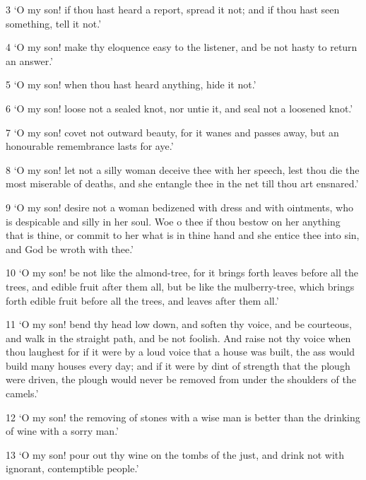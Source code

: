 \par 3 ‘O my son! if thou hast heard a report, spread it not; and if thou hast seen something, tell it not.’

\par 4 ‘O my son! make thy eloquence easy to the listener, and be not hasty to return an answer.’

\par 5 ‘O my son! when thou hast heard anything, hide it not.’

\par 6 ‘O my son! loose not a sealed knot, nor untie it, and seal not a loosened knot.’

\par 7 ‘O my son! covet not outward beauty, for it wanes and passes away, but an honourable remembrance lasts for aye.’

\par 8 ‘O my son! let not a silly woman deceive thee with her speech, lest thou die the most miserable of deaths, and she entangle thee in the net till thou art ensnared.’

\par 9 ‘O my son! desire not a woman bedizened with dress and with ointments, who is despicable and silly in her soul. Woe o thee if thou bestow on her anything that is thine, or commit to her what is in thine hand and she entice thee into sin, and God be wroth with thee.’

\par 10 ‘O my son! be not like the almond-tree, for it brings forth leaves before all the trees, and edible fruit after them all, but be like the mulberry-tree, which brings forth edible fruit before all the trees, and leaves after them all.’

\par 11 ‘O my son! bend thy head low down, and soften thy voice, and be courteous, and walk in the straight path, and be not foolish. And raise not thy voice when thou laughest for if it were by a loud voice that a house was built, the ass would build many houses every day; and if it were by dint of strength that the plough were driven, the plough would never be removed from under the shoulders of the camels.’

\par 12 ‘O my son! the removing of stones with a wise man is better than the drinking of wine with a sorry man.’

\par 13 ‘O my son! pour out thy wine on the tombs of the just, and drink not with ignorant, contemptible people.’

